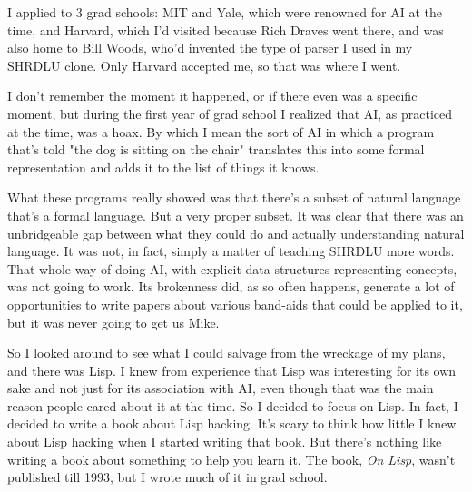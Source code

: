 I applied to 3 grad schools: MIT and
                  Yale, which were renowned for AI at the time, and Harvard,
                  which I'd visited because Rich Draves went there, and was also
                  home to Bill Woods, who'd invented the type of parser I used
                  in my SHRDLU clone. Only Harvard accepted me, so that was
                  where I went.

I don't remember the moment it
                  happened, or if there even was a specific moment, but during
                  the first year of grad school I realized that AI, as practiced
                  at the time, was a hoax. By which I mean the sort of AI in
                  which a program that's told "the dog is sitting on the chair"
                  translates this into some formal representation and adds it to
                  the list of things it knows.

What these programs
                  really showed was that there's a subset of natural language
                  that's a formal language. But a very proper subset. It was
                  clear that there was an unbridgeable gap between what they
                  could do and actually understanding natural language. It was
                  not, in fact, simply a matter of teaching SHRDLU more words.
                  That whole way of doing AI, with explicit data structures
                  representing concepts, was not going to work. Its brokenness
                  did, as so often happens, generate a lot of opportunities to
                  write papers about various band-aids that could be applied to
                  it, but it was never going to get us Mike.

So I
                  looked around to see what I could salvage from the wreckage of
                  my plans, and there was Lisp. I knew from experience that Lisp
                  was interesting for its own sake and not just for its
                  association with AI, even though that was the main reason
                  people cared about it at the time. So I decided to focus on
                  Lisp. In fact, I decided to write a book about Lisp hacking.
                  It's scary to think how little I knew about Lisp hacking when
                  I started writing that book. But there's nothing like writing
                  a book about something to help you learn it. The book,
                  \emph{On Lisp}, wasn't published till 1993, but I wrote much
                  of it in grad school.


